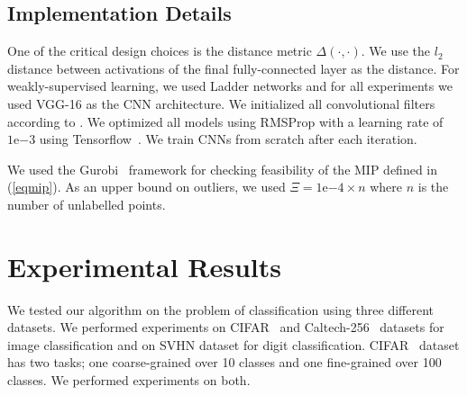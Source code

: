 \documentclass{article} %
\begin{document}
\subsection{Implementation Details} \label{sec:imp} One of the critical design choices is the distance metric
$\Delta(\cdot,\cdot)$. We use the $l_2$ distance between activations of the final fully-connected layer as the distance.
For weakly-supervised learning, we used Ladder networks \citep{ladder} and for all experiments we used VGG-16 \citep{vgg}
as the CNN architecture. We initialized all convolutional filters according to \citet{he_et_al}. We optimized all models using RMSProp with a learning rate of $1\mathrm{e}{-3}$ using
Tensorflow~\citep{tensorflow}. We train CNNs from scratch after each iteration. %

We used the Gurobi~\citep{gurobi} framework for checking feasibility of the MIP defined in (\ref{eqmip}). As an upper bound on outliers, we used $\Xi=1\mathrm{e}{-4} \times n$ where $n$ is the
number of unlabelled points.


\section{Experimental Results} \label{sec:exp} We tested our algorithm on the problem of classification using three
different datasets. We performed experiments on CIFAR~\citep{cifar} and Caltech-256~\citep{caltech256} datasets for
image classification and on SVHN\citep{svhn} dataset for digit classification. CIFAR~\citep{cifar} dataset has two
tasks; one coarse-grained over 10 classes and one fine-grained over 100 classes. We performed experiments on both.
\end{document}
